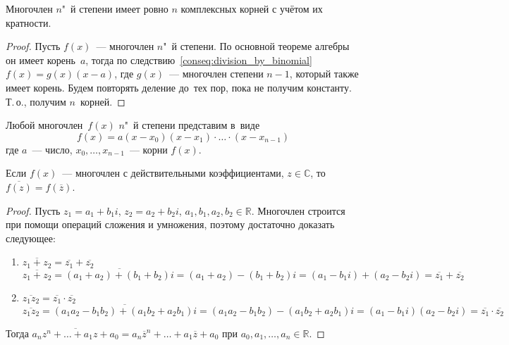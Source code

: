 \begin{consequent}
\label{conseq:n_roots_of_polynomial}
Многочлен $n$"~й степени имеет ровно $n$ комплексных корней с учётом их кратности.
\end{consequent}
\begin{proof}
Пусть $f(x)$~--- многочлен $n$"~й степени.
По основной теореме алгебры он имеет корень~$a$, тогда по следствию~\ref*{conseq:division_by_binomial} $f(x) = g(x)(x - a)$, где $g(x)$~--- многочлен степени $n - 1$, который также имеет корень.
Будем повторять деление до~тех пор, пока не получим константу.
Т.\,о., получим $n$~корней.
\end{proof}

\begin{consequent}
Любой многочлен~$f(x)$ $n$"~й степени представим в~виде
\begin{equation*}
f(x) = a(x - x_0)(x - x_1) \cdot \ldots \cdot (x - x_{n-1})
\end{equation*}
где $a$~--- число, $x_0, \ldots, x_{n-1}$~--- корни $f(x)$.
\end{consequent}

\begin{lemma}
Если $f(x)$~--- многочлен с действительными коэффициентами, $z \in \mathbb C$, то $\overline{f(z)} = f(\overline z)$.
\end{lemma}
\begin{proof}
Пусть $z_1 = a_1 + b_1 i$, $z_2 = a_2 + b_2 i$, $a_1, b_1, a_2, b_2 \in \mathbb R$.
Многочлен строится при помощи операций сложения и умножения, поэтому достаточно доказать следующее:
\begin{enumerate}
	\item $\overline{z_1 + z_2} = \overline{z_1} + \overline{z_2}$
	\begin{equation*}
	\overline{z_1 + z_2} = \overline{(a_1 + a_2) + (b_1 + b_2)i} = (a_1 + a_2) - (b_1 + b_2)i =
	(a_1 - b_1 i) + (a_2 - b_2 i) = \overline{z_1} + \overline{z_2}
	\end{equation*}
	
	\item $\overline{z_1 z_2} = \overline{z_1} \cdot \overline{z_2}$
	\begin{equation*}
	\overline{z_1 z_2} = \overline{(a_1 a_2 - b_1 b_2) + (a_1 b_2 + a_2 b_1)i} =
	(a_1 a_2 - b_1 b_2) - (a_1 b_2 + a_2 b_1)i = (a_1 - b_1 i)(a_2 - b_2 i) =
	\overline{z_1} \cdot \overline{z_2}
	\end{equation*}
\end{enumerate}
Тогда $\overline{a_n z^n + \ldots + a_1 z + a_0} = a_n \overline z^n + \ldots + a_1 \overline z + a_0$ при $a_0, a_1, \ldots, a_n \in \mathbb R$.
\end{proof}

